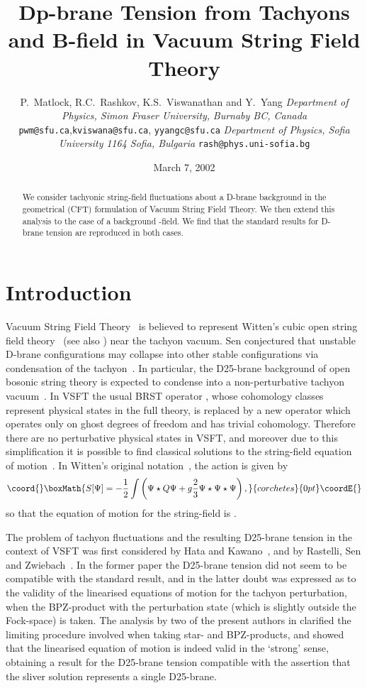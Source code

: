 \documentclass[letterpaper,12pt]{article}
\title{Dp-brane Tension from Tachyons and B-field in Vacuum String Field Theory}
\author{P.~Matlock\myHighlight{$^a$}\coordHE{}, R.C.~Rashkov\myHighlight{$^b$}\coordHE{}, K.S.~Viswanathan\myHighlight{$^a$}\coordHE{} and Y.~Yang\myHighlight{$^a$}\coordHE{} \cr\cr
     \myHighlight{${}^a$}\coordHE{} \small \emph{Department of Physics, Simon Fraser University,}\cr
            \small \emph{Burnaby BC, Canada}\cr 
            \small \texttt{pwm@sfu.ca},\quad \texttt{kviswana@sfu.ca},
            \quad \texttt{yyangc@sfu.ca}\cr 
     \myHighlight{${}^b$}\coordHE{} \small \emph{Department of Physics, Sofia University}\cr
            \small \emph{1164 Sofia, Bulgaria}\cr
            \small \texttt{rash@phys.uni-sofia.bg} }
\date{March 7\myHighlight{$^{\textup{th}}$}\coordHE{}, 2002}
\def\Pcm#1{{\mathcal{#1}}}
\begin{document}
 
\maketitle 
\begin{abstract}
  We consider tachyonic string-field fluctuations about a 
D\coordHE{}-brane background in the geometrical (CFT) formulation 
of Vacuum String Field Theory. We then extend this analysis
to the case of a background \coordHE{}-field. We find that the standard
results for D-brane tension are reproduced in both cases.
\end{abstract}
\newpage
\section{Introduction}
 Vacuum String Field Theory~\cite{RSZ5} is believed to represent Witten's cubic open 
string field theory~\cite{Witten1} (see also \cite{GJ1,GJ2,KP,GT1,GT2}) near the tachyon vacuum.
Sen conjectured that unstable D-brane configurations may collapse into other
stable configurations via condensation of the tachyon~\cite{Sen,Sen2}. In particular, the
D25-brane background of open bosonic string theory is expected to condense into a
non-perturbative tachyon vacuum~\cite{RZ,RSZ1}.
In VSFT the usual BRST operator \coordHE{}, whose cohomology classes represent physical 
states in the
full theory, is replaced by a new operator \myHighlight{$\Pcm{Q}$}\coordHE{} which operates only on ghost degrees of freedom
and has trivial cohomology. Therefore there are no perturbative physical states in 
VSFT, and moreover due to this simplification it is possible to find classical solutions 
to the string-field equation of motion~\cite{KP,GT1,RSZ2,RSZ5}. 
In Witten's original notation~\cite{Witten1}, the action is given by
\[\coord{}\boxMath{S[\Psi]=-\frac12\int\left(\Psi\star Q \Psi +g\frac23 \Psi\star\Psi\star\Psi \right),}{corchetes}{0pt}\coordE{}\]
so that the equation of motion for the string-field \myHighlight{$\Psi$}\coordHE{} is \coordHE{}.

 The problem of tachyon fluctuations and the resulting D25-brane tension in the context of VSFT 
was first considered by Hata and Kawano~\cite{HK}, and by Rastelli, Sen and Zwiebach~\cite{RSZ6}.
In the former paper the D25-brane tension did not seem to be compatible with the standard result,
and in the latter doubt was expressed as to the validity of the linearised equations 
of motion for the tachyon perturbation, when the BPZ-product with the perturbation state (which is
slightly outside the Fock-space) is taken. The analysis by two of the present authors in \cite{RV}
clarified the limiting procedure involved when taking star- and BPZ-products, and showed 
that the linearised equation of motion is indeed valid in the `strong' sense, obtaining a result
for the D25-brane tension compatible with the assertion that the sliver solution represents 
a single D25-brane.
\end{document}
